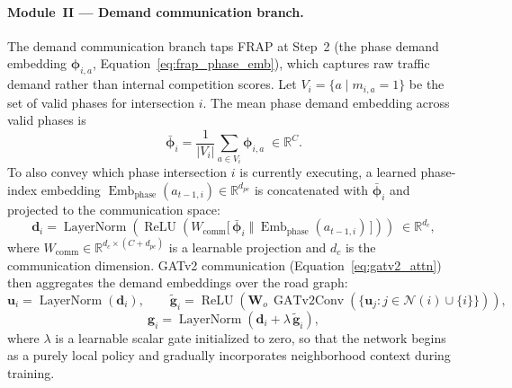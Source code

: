 \paragraph{Module~II — Demand communication branch.}
The demand communication branch taps FRAP at Step~2 (the phase demand embedding $\boldsymbol{\phi}_{i,a}$, Equation~\ref{eq:frap_phase_emb}), which captures raw traffic demand rather than internal competition scores. Let $V_i = \{a \mid m_{i,a} = 1\}$ be the set of valid phases for intersection $i$. The mean phase demand embedding across valid phases is
\begin{equation}
  \bar{\boldsymbol{\phi}}_i
  = \frac{1}{|V_i|} \sum_{a \in V_i} \boldsymbol{\phi}_{i,a}
  \;\in \mathbb{R}^{C}.
  \label{eq:fgsv3_phi_mean}
\end{equation}
To also convey which phase intersection $i$ is currently executing, a learned phase-index embedding $\operatorname{Emb}_{\mathrm{phase}}(a_{t-1,i}) \in \mathbb{R}^{d_{pe}}$ is concatenated with $\bar{\boldsymbol{\phi}}_i$ and projected to the communication space:
\begin{equation}
  \mathbf{d}_i
  = \operatorname{LayerNorm}\!\left(
  \operatorname{ReLU}\!\left(
  W_{\mathrm{comm}}
  \bigl[\,\bar{\boldsymbol{\phi}}_i \;\Vert\; \operatorname{Emb}_{\mathrm{phase}}(a_{t-1,i})\,\bigr]
  \right)
  \right)
  \;\in \mathbb{R}^{d_c},
  \label{eq:fgsv3_demand}
\end{equation}
where $W_{\mathrm{comm}} \in \mathbb{R}^{d_c \times (C + d_{pe})}$ is a learnable projection and $d_c$ is the communication dimension. GATv2 communication (Equation~\ref{eq:gatv2_attn}) then aggregates the demand embeddings over the road graph:
\begin{equation}
  \mathbf{u}_i = \operatorname{LayerNorm}(\mathbf{d}_i), \qquad
  \tilde{\mathbf{g}}_i = \operatorname{ReLU}\!\left(
    \mathbf{W}_o\,\operatorname{GATv2Conv}\!\left(\{\mathbf{u}_j : j \in \mathcal{N}(i) \cup \{i\}\}\right)
  \right),
  \label{eq:fgsv3_gatv2}
\end{equation}
\begin{equation}
  \mathbf{g}_i = \operatorname{LayerNorm}\!\left(\mathbf{d}_i + \lambda\,\tilde{\mathbf{g}}_i\right),
  \label{eq:fgsv3_gate}
\end{equation}
where $\lambda$ is a learnable scalar gate initialized to zero, so that the network begins as a purely local policy and gradually incorporates neighborhood context during training.

